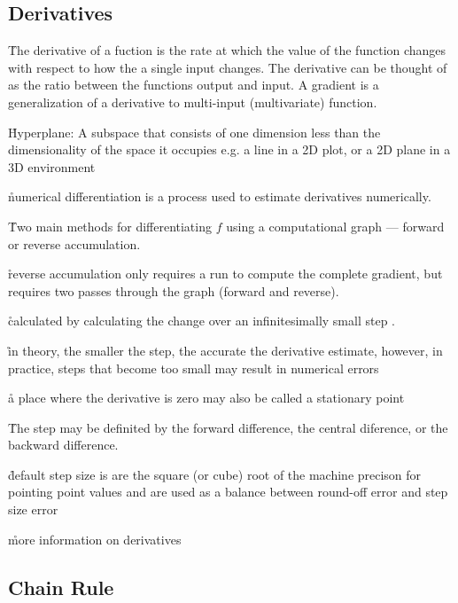 \subsection{Derivatives}

\r{The derivative of a fuction is the rate at which the value of the function changes with respect to how the a single input changes. The derivative can be thought of as the ratio between the functions output and input. A gradient is a generalization of a derivative to multi-input (multivariate) function.}



\r{Hyperplane: A subspace that consists of one dimension less than the dimensionality of the space it occupies e.g. a line in a 2D plot, or a 2D plane in a 3D environment}

\r{numerical differentiation is a process used to estimate derivatives numerically.}

\r{Two main methods for differentiating $f$ using a computational graph --- forward or reverse accumulation.}

\r{reverse accumulation\cite{linnainmaa1970representation} only requires a run to compute the complete gradient, but requires two passes through the graph (forward and reverse). }


\r{calculated by calculating the change over an infinitesimally small step .}

\r{in theory, the smaller the step, the accurate the derivative estimate, however, in practice, steps that become too small may result in numerical errors}

\r{a place where the derivative is zero may also be called a stationary point}

\r{The step may be definited by the forward difference, the central diference, or the backward difference. }

\r{default step size is are the square (or cube) root of the machine precison for pointing point values\cite{kochenderfer2019algorithms} and are used as a balance between round-off error and step size error }

\r{more information on derivatives\cite{griewank2008evaluating}}

\subsection{Chain Rule}

